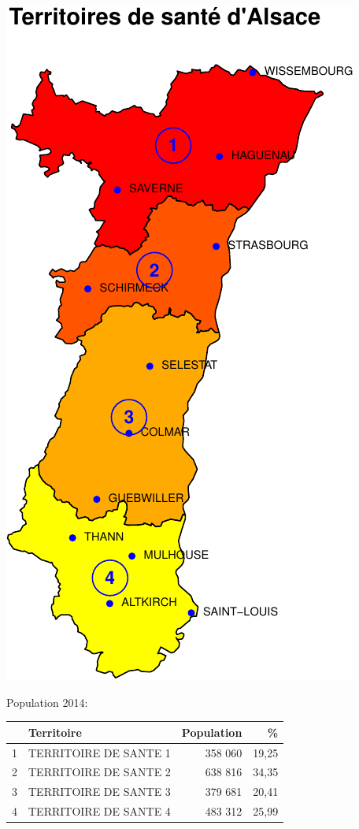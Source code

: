 \documentclass[]{article}
\begin{document}
\begin{center}\includegraphics{Figs/unnamed-chunk-40-1} \end{center}

Population 2014:

\begin{table}[ht]
\centering
\begin{tabular}{rlrr}
  \hline
 & Territoire & Population & \% \\ 
  \hline
1 & TERRITOIRE DE SANTE 1 & 358 060 & 19,25 \\ 
  2 & TERRITOIRE DE SANTE 2 & 638 816 & 34,35 \\ 
  3 & TERRITOIRE DE SANTE 3 & 379 681 & 20,41 \\ 
  4 & TERRITOIRE DE SANTE 4 & 483 312 & 25,99 \\ 
   \hline
\end{tabular}
\end{table}
\end{document}
